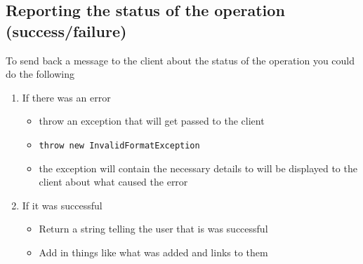 \documentclass[10pt,letterpaper,onecolumn,oneside]{report}
\begin{document}
\subsection{Reporting the status of the operation (success/failure)}
To send back a message to the client about the status of the operation you could do the following
\begin{enumerate}
\item If there was an error
\begin{itemize}
\item throw an exception that will get passed to the client
\item \texttt{throw new InvalidFormatException}
\item the exception will contain the necessary details to will be displayed to the client about what caused the error
\end{itemize}
\item If it was successful
\begin{itemize}
\item Return a string telling the user that is was successful
\item Add in things like what was added and links to them
\end{itemize}
\end{enumerate}
\end{document}
